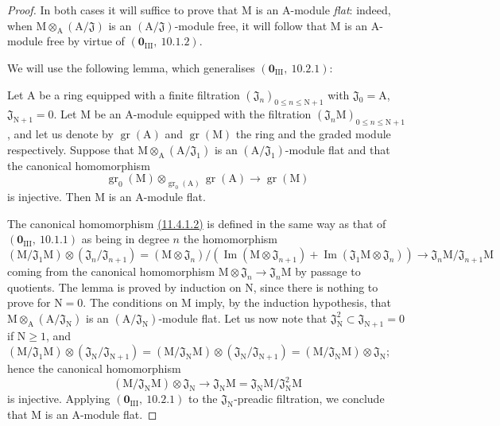\begin{proof}
In both cases it will suffice to prove that $\mathrm{M}$ is an $\mathrm{A}$-module \emph{flat}: indeed,
when $\mathrm{M}\otimes_\mathrm{A}(\mathrm{A}/\mathfrak{J})$ is an $(\mathrm{A}/\mathfrak{J})$-module free, it will follow that $\mathrm{M}$ is an $\mathrm{A}$-module
free by virtue of $(\mathbf{0}_{\mathrm{III}},~10.1.2)$.

We will use the following lemma, which generalises $(\mathbf{0}_{\mathrm{III}},~10.2.1)$:

\begin{lemma}[11.4.1.1]
\label{IV.11.4.1.1}
Let $\mathrm{A}$ be a ring equipped with a finite filtration $(\mathfrak{J}_n)_{0\leq n\leq\mathrm{N}+1}$ with
$\mathfrak{J}_0=\mathrm{A}$, $\mathfrak{J}_{\mathrm{N}+1}=0$. Let $\mathrm{M}$ be an $\mathrm{A}$-module equipped with the filtration $(\mathfrak{J}_n\mathrm{M})_{0\leq n\leq\mathrm{N}+1}$, and let us denote
by $\operatorname{gr}(\mathrm{A})$ and $\operatorname{gr}(\mathrm{M})$ the ring and the graded module respectively. Suppose that $\mathrm{M}\otimes_\mathrm{A}(\mathrm{A}/\mathfrak{J}_1)$
is an $(\mathrm{A}/\mathfrak{J}_1)$-module flat and that the canonical homomorphism
\[
\label{IV.11.4.1.2}
\operatorname{gr}_0(\mathrm{M})\otimes_{\operatorname{gr}_0(\mathrm{A})}\operatorname{gr}(\mathrm{A}) \to \operatorname{gr}(\mathrm{M})
\tag{11.4.1.2}
\]
is injective. Then $\mathrm{M}$ is an $\mathrm{A}$-module flat.
\end{lemma}

The canonical homomorphism \hyperref[IV.11.4.1.2]{(11.4.1.2)} is defined in the same way as that
of $(\mathbf{0}_{\mathrm{III}},~10.1.1)$ as being in degree $n$ the homomorphism
\[
(\mathrm{M}/\mathfrak{J}_1\mathrm{M})\otimes(\mathfrak{J}_n/\mathfrak{J}_{n+1})=(\mathrm{M}\otimes\mathfrak{J}_n)/(\operatorname{Im}(\mathrm{M}\otimes\mathfrak{J}_{n+1})+\operatorname{Im}(\mathfrak{J}_1\mathrm{M}\otimes\mathfrak{J}_n))\to\mathfrak{J}_n\mathrm{M}/\mathfrak{J}_{n+1}\mathrm{M}
\]
coming from the canonical homomorphism $\mathrm{M}\otimes\mathfrak{J}_n\to\mathfrak{J}_n\mathrm{M}$ by passage to quotients.
The lemma is proved by induction on $\mathrm{N}$, since there is nothing to prove for $\mathrm{N}=0$.
The conditions on $\mathrm{M}$ imply, by the induction hypothesis, that $\mathrm{M}\otimes_\mathrm{A}(\mathrm{A}/\mathfrak{J}_\mathrm{N})$
is an $(\mathrm{A}/\mathfrak{J}_\mathrm{N})$-module flat. Let us now note that $\mathfrak{J}_\mathrm{N}^2\subset\mathfrak{J}_{\mathrm{N}+1}=0$ if $\mathrm{N}\geq 1$, and
$(\mathrm{M}/\mathfrak{J}_1\mathrm{M})\otimes(\mathfrak{J}_\mathrm{N}/\mathfrak{J}_{\mathrm{N}+1})=(\mathrm{M}/\mathfrak{J}_\mathrm{N}\mathrm{M})\otimes(\mathfrak{J}_\mathrm{N}/\mathfrak{J}_{\mathrm{N}+1})=(\mathrm{M}/\mathfrak{J}_\mathrm{N}\mathrm{M})\otimes\mathfrak{J}_\mathrm{N}$; hence the canonical homomorphism
\[
(\mathrm{M}/\mathfrak{J}_\mathrm{N}\mathrm{M})\otimes\mathfrak{J}_\mathrm{N} \to \mathfrak{J}_\mathrm{N}\mathrm{M}=\mathfrak{J}_\mathrm{N}\mathrm{M}/\mathfrak{J}_\mathrm{N}^2\mathrm{M}
\]
is injective. Applying $(\mathbf{0}_{\mathrm{III}},~10.2.1)$ to the $\mathfrak{J}_\mathrm{N}$-preadic filtration, we conclude that
$\mathrm{M}$ is an $\mathrm{A}$-module flat.


\end{proof}
